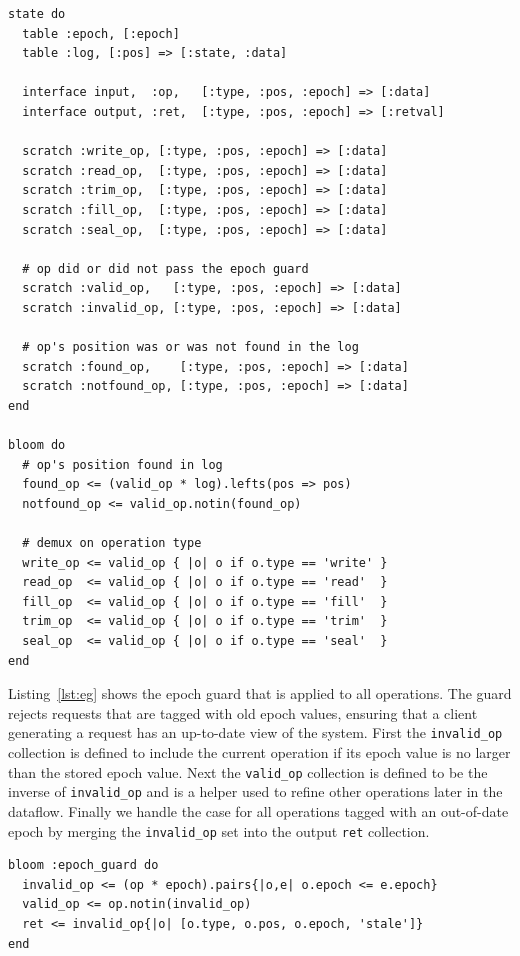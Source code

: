 \documentclass[10pt,twocolumn]{article}
\begin{document}
\begin{lstlisting}[caption={Epoch Guard}, label=lst:eg]
state do
  table :epoch, [:epoch]
  table :log, [:pos] => [:state, :data]

  interface input,  :op,   [:type, :pos, :epoch] => [:data]
  interface output, :ret,  [:type, :pos, :epoch] => [:retval]

  scratch :write_op, [:type, :pos, :epoch] => [:data]
  scratch :read_op,  [:type, :pos, :epoch] => [:data]
  scratch :trim_op,  [:type, :pos, :epoch] => [:data]
  scratch :fill_op,  [:type, :pos, :epoch] => [:data]
  scratch :seal_op,  [:type, :pos, :epoch] => [:data]

  # op did or did not pass the epoch guard
  scratch :valid_op,   [:type, :pos, :epoch] => [:data]
  scratch :invalid_op, [:type, :pos, :epoch] => [:data]

  # op's position was or was not found in the log
  scratch :found_op,    [:type, :pos, :epoch] => [:data]
  scratch :notfound_op, [:type, :pos, :epoch] => [:data]
end

bloom do
  # op's position found in log
  found_op <= (valid_op * log).lefts(pos => pos)
  notfound_op <= valid_op.notin(found_op)

  # demux on operation type
  write_op <= valid_op { |o| o if o.type == 'write' }
  read_op  <= valid_op { |o| o if o.type == 'read'  }
  fill_op  <= valid_op { |o| o if o.type == 'fill'  }
  trim_op  <= valid_op { |o| o if o.type == 'trim'  }
  seal_op  <= valid_op { |o| o if o.type == 'seal'  }
end
\end{lstlisting}

Listing~\ref{lst:eg} shows the epoch guard that is applied to all operations.
The guard rejects requests that are tagged with old epoch values, ensuring that
a client generating a request has an up-to-date view of the system.  First the
\texttt{invalid\_op} collection is defined to include the current operation if
its epoch value is no larger than the stored epoch value. Next the
\texttt{valid\_op} collection is defined to be the inverse of
\texttt{invalid\_op} and is a helper used to refine other operations later in
the dataflow. Finally we handle the case for all operations tagged with an
out-of-date epoch by merging the \texttt{invalid\_op} set into the output
\texttt{ret} collection.

\begin{lstlisting}[caption={Epoch Guard}, label=lst:eg]
bloom :epoch_guard do
  invalid_op <= (op * epoch).pairs{|o,e| o.epoch <= e.epoch}
  valid_op <= op.notin(invalid_op)
  ret <= invalid_op{|o| [o.type, o.pos, o.epoch, 'stale']}
end
\end{lstlisting}
\end{document}
